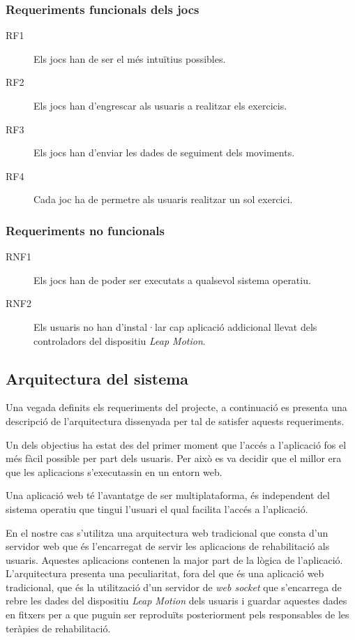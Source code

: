 \documentclass[12pt,a4paper,catalan]{article}
\begin{document}
	\subsubsection*{Requeriments funcionals dels jocs}
	\begin{description}
		\item [RF1] Els jocs han de ser el més intuïtius possibles.
		\item [RF2] Els jocs han d'engrescar als usuaris a realitzar els exercicis.
		\item [RF3] Els jocs han d'enviar les dades de seguiment dels moviments.
		\item [RF4] Cada joc ha de permetre als usuaris realitzar un sol exercici.
	\end{description}
	\subsubsection*{Requeriments no funcionals}
	\begin{description}
		\item [RNF1] Els jocs han de poder ser executats a qualsevol sistema operatiu.
		\item [RNF2] Els usuaris no han d'instal·lar cap aplicació addicional llevat dels controladors del dispositiu \textit{Leap Motion}.
	\end{description}
	\subsection{Arquitectura del sistema}
	Una vegada definits els requeriments del projecte, a continuació es presenta una descripció de l'arquitectura dissenyada per tal de satisfer aquests requeriments.
	
	Un dels objectius ha estat des del primer moment que l'accés a l'aplicació fos el més fàcil possible per part dels usuaris. Per això es va decidir que el millor era que les aplicacions s'executassin en un entorn web.
	
	Una aplicació web té l'avantatge de ser multiplataforma, és independent del sistema operatiu que tingui l'usuari el qual facilita l'accés a l'aplicació.
	
	En el nostre cas s'utilitza una arquitectura web tradicional que consta d'un servidor web que és l'encarregat de servir les aplicacions de rehabilitació als usuaris. Aquestes aplicacions contenen la major part de la lògica de l'aplicació. L'arquitectura presenta una peculiaritat, fora del que és una aplicació web tradicional, que és la utilització d'un servidor de \textit{web socket} que s'encarrega de rebre les dades del dispositiu \textit{Leap Motion} dels usuaris i guardar aquestes dades en fitxers per a que puguin ser reproduïts posteriorment pels responsables de les teràpies de rehabilitació.\\
	
\end{document}
